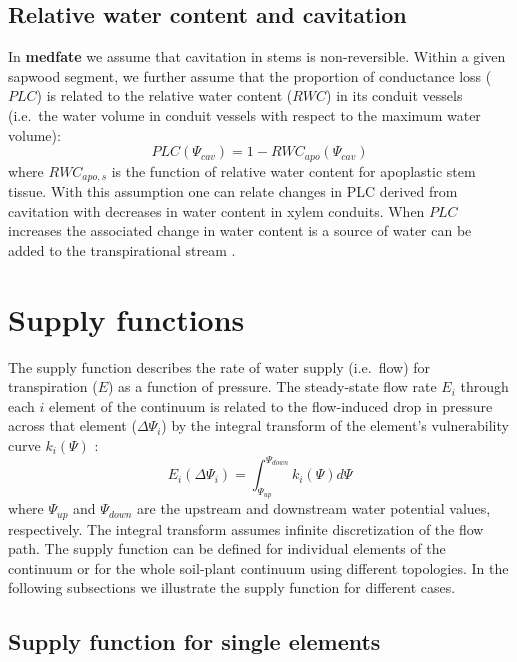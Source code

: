 \documentclass[]{book}
\begin{document}
\hypertarget{relative-water-content-and-cavitation}{%
\subsection{Relative water content and cavitation}\label{relative-water-content-and-cavitation}}

In \textbf{medfate} we assume that cavitation in stems is non-reversible. Within a given sapwood segment, we further assume that the proportion of conductance loss (\(PLC\)) is related to the relative water content (\(RWC\)) in its conduit vessels (i.e.~the water volume in conduit vessels with respect to the maximum water volume):
\begin{equation}
PLC(\Psi_{cav}) = 1 - RWC_{apo}(\Psi_{cav})
\end{equation}
where \(RWC_{apo,s}\) is the function of relative water content for apoplastic stem tissue. With this assumption one can relate changes in PLC derived from cavitation with decreases in water content in xylem conduits. When \(PLC\) increases the associated change in water content is a source of water can be added to the transpirational stream \citep{Martin-StPaul2017}.

\hypertarget{supply-functions}{%
\section{Supply functions}\label{supply-functions}}

The supply function describes the rate of water supply (i.e.~flow) for transpiration (\(E\)) as a function of pressure. The steady-state flow rate \(E_i\) through each \(i\) element of the continuum is related to the flow-induced drop in pressure across that element (\(\Delta \Psi_i\)) by the integral transform of the element's vulnerability curve \(k_i(\Psi)\) \citep{Sperry2015}:
\begin{equation}
E_i(\Delta \Psi_i) = \int_{\Psi_{up}}^{\Psi_{down}}{k_i(\Psi) d\Psi}
\label{eq:generalsupply}
\end{equation}
where \(\Psi_{up}\) and \(\Psi_{down}\) are the upstream and downstream water potential values, respectively. The integral transform assumes infinite discretization of the flow path. The supply function can be defined for individual elements of the continuum or for the whole soil-plant continuum using different topologies. In the following subsections we illustrate the supply function for different cases.

\hypertarget{supply-function-for-single-elements}{%
\subsection{Supply function for single elements}\label{supply-function-for-single-elements}}
\end{document}
